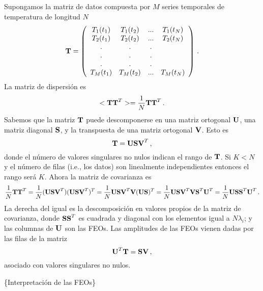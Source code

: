 \documentclass[
]{agujournal2019}
\begin{document}
Supongamos la matriz de datos compuesta por \(M\) series temporales de
temperatura de longitud \(N\) \[{\textbf T}=\left(\begin{array}{cccc}
   T_{1}(t_1) & T_{1}(t_2) & ... & T_{1}(t_N)\\
   T_{2}(t_1) & T_{2}(t_2) & ... & T_{2}(t_N)\\
                . & . & . \\
        . & . & . \\
        . & . & . \\
   T_{M}(t_1) & T_{M}(t_2) & ... & T_{M}(t_N)\\
        \end{array}\right)\,.\] La matriz de dispersión es
\[<{\textbf T}{\textbf T}^T>=\frac{1}{N} {\textbf T}{\textbf T}^T\,.\]
Sabemos que la matriz \({\textbf T}\) puede descomponerse en una matriz
ortogonal \({\textbf U}\), una matriz diagonal \({\textbf S}\), y la
transpuesta de una matriz ortogonal \({\textbf V}\). Esto es
\[{\textbf T}={\textbf U}{\textbf S}{\textbf V}^T\,,\] donde el número
de valores singulares no nulos indican el rango de \({\textbf T}\). Si
\(K<N\) y el número de filas (i.e., los datos) son linealmente
independientes entonces el rango será \(K\). Ahora la matriz de
covarianza es
\[\frac{1}{N} {\textbf T}{\textbf T}^T = \frac{1}{N} ({\textbf U}{\textbf S}{\textbf V}^T)({\textbf U}{\textbf S}{\textbf V}^T)^T=
\frac{1}{N}{\textbf U}{\textbf S}{\textbf V}^T{\textbf V}({\textbf U}{\textbf S})^T=\frac{1}{N} {\textbf U}{\textbf S}{\textbf V}^T{\textbf V}{\textbf S}^T{\textbf U}^T=\frac{1}{N} {\textbf U}{\textbf S}{\textbf S}^T{\textbf U}^T\,.\]
La derecha del igual es la descomposición en valores propios de la
matriz de covarianza, donde \({\textbf S}{\textbf S}^T\) es cuadrada y
diagonal con los elementos igual a \(N\lambda_i\); y las columnas de
\({\textbf U}\) son las FEOs. Las amplitudes de las FEOs vienen dadas
por las filas de la matriz
\[{\textbf U}^T{\textbf T}={\textbf S}{\textbf V}\,,\] asociado con
valores singulares no nulos.

\vspace{0.25cm}

\{\textbf \noindent Interpretación de las FEOs\}
\end{document}
